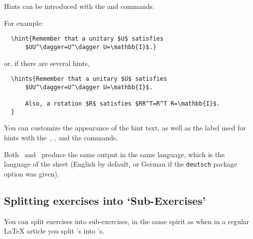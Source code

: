 \documentclass[11pt,a4paper]{article}
\begin{document}
Hints can be introduced with the  and  commands.



For example:
\begin{pkgverbatim}
\begin{verbatim}
  \hint{Remember that a unitary $U$ satisfies
      $UU^\dagger=U^\dagger U=\mathbb{I}$.}
\end{verbatim}
\end{pkgverbatim}
or, if there are several hints,
\begin{pkgverbatim}
\begin{verbatim}
  \hints{Remember that a unitary $U$ satisfies
      $UU^\dagger=U^\dagger U=\mathbb{I}$.

      Also, a rotation $R$ satisfies $RR^T=R^T R=\mathbb{I}$.
  }
\end{verbatim}
\end{pkgverbatim}

\begin{pkgtip}
  You can customize the appearance of the hint text, as well as the label used for hints
  with the~, , and the
   commands.
\end{pkgtip}



\begin{pkgnotice}
  Both~ and~ produce the same output in the same
  language, which is the language of the sheet (English by default, or German if the
  \texttt{deutsch} package option was given).
\end{pkgnotice}


\subsection{Splitting exercises into `Sub-Exercises'}
\label{sec:subexercises}

You can split exercises into sub-exercises, in the same spirit as when in a regular
\LaTeX{} article you split 's into 's.
\end{document}
